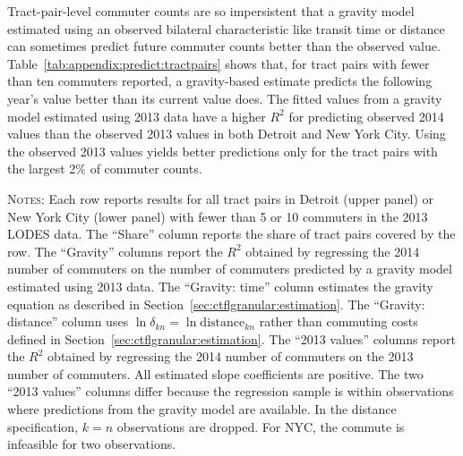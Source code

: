 \documentclass[11pt]{article}
\theoremstyle{definition}
\begin{document}
Tract-pair-level commuter counts are so impersistent that
a gravity model estimated using an observed bilateral characteristic like transit time or distance
can sometimes predict future commuter counts better than the observed value.
Table~\ref{tab:appendix:predict:tractpairs} shows that,
for tract pairs with fewer than ten commuters reported,
a gravity-based estimate predicts the following year's value better than its current value does.
The fitted values from a gravity model estimated using 2013 data have a higher $R^2$ for predicting observed 2014 values than the observed 2013 values in both Detroit and New York City.
Using the observed 2013 values yields better predictions only for the tract pairs with the largest 2\% of commuter counts.

\begin{table}[h]
\caption{Gravity-based estimates predict 2014 values better than 2013 values do}
\label{tab:appendix:predict:tractpairs}
\begin{center} \vspace{-4mm}
\resizebox{\textwidth}{!}{

}
\begin{minipage}{0.98\textwidth}{\footnotesize
\textsc{Notes}:
Each row reports results for all tract pairs in Detroit (upper panel) or New York City (lower panel) with fewer than 5 or 10 commuters in the 2013 LODES data.
The ``Share'' column reports the share of tract pairs covered by the row.
The ``Gravity'' columns report the $R^2$ obtained by regressing the 2014 number of commuters on the number of commuters predicted by a gravity model estimated using 2013 data.
The ``Gravity: time'' column estimates the gravity equation as described in Section~\ref{sec:ctflgranular:estimation}.
The ``Gravity: distance'' column uses $\ln \delta_{kn} = \ln \text{distance}_{kn}$ rather than commuting costs defined in Section~\ref{sec:ctflgranular:estimation}.
The ``2013 values'' columns report the $R^2$ obtained by regressing the 2014 number of commuters on the 2013 number of commuters.
All estimated slope coefficients are positive.
The two ``2013 values'' columns differ because the regression sample is within observations where predictions from the gravity model are available.
In the distance specification, $k = n$ observations are dropped.
For NYC, the commute is infeasible for two observations.
\par}\end{minipage}
\end{center}
\end{table}
\end{document}
